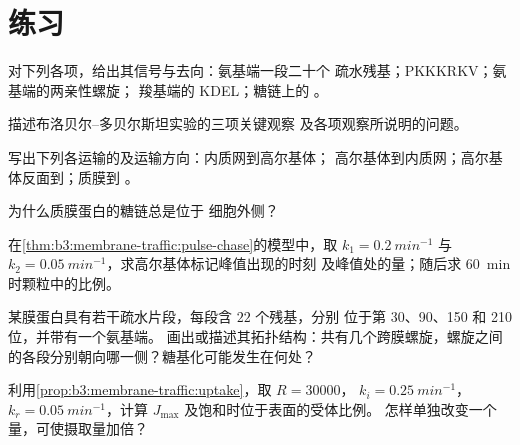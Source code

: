 \section{练习}

\begin{exercise}[$\star$]\label{exo:b3:membrane-traffic:1}
对下列各项，给出其信号与去向：氨基端一段二十个
疏水残基；PKKKRKV；氨基端的两亲性螺旋；
羧基端的 KDEL；糖链上的
。
\end{exercise}

\begin{exercise}[$\star$]\label{exo:b3:membrane-traffic:2}
描述布洛贝尔–多贝尔斯坦实验的三项关键观察
及各项观察所说明的问题。
\end{exercise}

\begin{exercise}[$\star$]\label{exo:b3:membrane-traffic:3}
写出下列各运输的及运输方向：内质网到高尔基体；
高尔基体到内质网；高尔基体反面到；质膜到
。
\end{exercise}

\begin{exercise}[$\star$]\label{exo:b3:membrane-traffic:4}
为什么质膜蛋白的糖链总是位于
细胞外侧？
\end{exercise}

\begin{exercise}[$\star\star$]\label{exo:b3:membrane-traffic:5}
在\cref{thm:b3:membrane-traffic:pulse-chase}的模型中，取 $k_{1}
= \qty{0.2}{min^{-1}}$ 与 $k_{2} = \qty{0.05}{min^{-1}}$，求高尔基体标记峰值出现的时刻
及峰值处的量；随后求
\qty{60}{min} 时颗粒中的比例。
\end{exercise}

\begin{exercise}[$\star\star$]\label{exo:b3:membrane-traffic:6}
某膜蛋白具有若干疏水片段，每段含 $22$ 个残基，分别
位于第 30、90、150 和 210 位，并带有一个氨基端。
画出或描述其拓扑结构：共有几个跨膜螺旋，螺旋之间
的各段分别朝向哪一侧？糖基化可能发生在何处？
\end{exercise}

\begin{exercise}[$\star\star$]\label{exo:b3:membrane-traffic:7}
利用\cref{prop:b3:membrane-traffic:uptake}，取 $R = \num{30000}$，
$k_{i} = \qty{0.25}{min^{-1}}$，$k_{r} = \qty{0.05}{min^{-1}}$，计算
$J_{\max}$ 及饱和时位于表面的受体比例。
怎样单独改变一个量，可使摄取量加倍？
\end{exercise}

